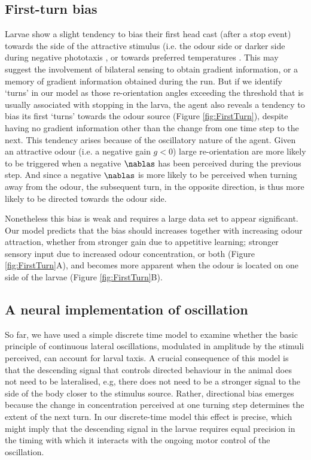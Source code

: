\documentclass[11pt,a4paper]{article}
\begin{document}
\subsection{First-turn bias}
Larvae show a slight tendency to bias their first head cast (after a stop event) towards the side of the attractive stimulus (i.e. the odour side \citep{gomez2011active,gomez2012active} or darker side during negative phototaxis \citep{kane2013sensorimotor}, or towards preferred temperatures \citep{luo2010navigational}. This may suggest the involvement of bilateral sensing to obtain gradient information, or a memory of gradient information obtained during the run. But if we identify ‘turns’ in our model as those re-orientation angles exceeding the threshold that is usually associated with stopping in the larva, the agent also reveals a tendency to bias its first `turns' towards the odour source (Figure \ref{fig:FirstTurn}), despite having no gradient information other than the change from one time step to the next. This tendency arises because of the oscillatory nature of the agent. Given an attractive odour (i.e. a negative gain $g<0$) large re-orientation are more likely to be triggered when a negative $\nablas$ has been perceived during the previous step. And since a negative $\nablas$ is more likely to be perceived when turning away from the odour, the subsequent turn, in the opposite direction, is thus more likely to be directed towards the odour side. 

Nonetheless this bias is weak and requires a large data set to appear significant. Our model predicts that the bias should increases together with increasing odour attraction, whether from stronger gain due to appetitive learning; stronger sensory input due to increased odour concentration, or both (Figure \ref{fig:FirstTurn}A), and becomes more apparent when the odour is located on one side of the larvae (Figure \ref{fig:FirstTurn}B).

\subsection{A neural implementation of oscillation}
So far, we have used a simple discrete time model to examine whether the basic principle of continuous lateral oscillations, modulated in amplitude by the stimuli perceived, can account for larval taxis.
 A crucial consequence of this model is that the descending signal that controls directed behaviour in the animal does not need to be lateralised, e.g, there does not need to be a stronger signal to the side of the body closer to the stimulus source. Rather, directional bias emerges because the change in concentration perceived at one turning step determines the extent of the next turn.
  In our discrete-time model this effect is precise, which might imply that the descending signal in the larvae requires equal precision in the timing with which it interacts with the ongoing motor control of the oscillation.
\end{document}
